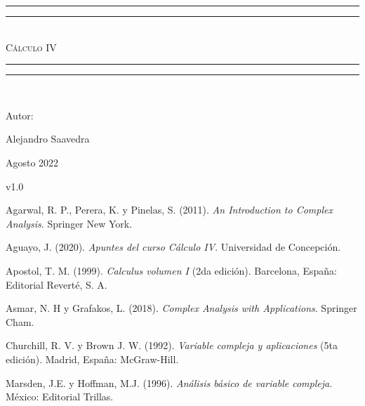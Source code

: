 \documentclass[letterpaper,12pt]{report}
\newlength{\drop}
\begin{document}
\begin{titlepage}
 \textheight
    \centering
    \vspace*{\baselineskip}
    \rule{\textwidth}{1.6pt}\vspace*{-\baselineskip}\vspace*{2pt}
    \rule{\textwidth}{0.4pt}\\[\baselineskip]
    {\scshape\Huge Cálculo IV} \\[0.2\baselineskip]
    \rule{\textwidth}{0.4pt}\vspace*{-\baselineskip}\vspace{3.2pt}
    \rule{\textwidth}{1.6pt}\\[\baselineskip]
    {\Large Autor: \par}
{\Large Alejandro Saavedra \par}
\vfill
{\large Agosto 2022 \par}
{\large v1.0 \par}
\end{titlepage}
\tableofcontents









\begin{thebibliography}{99}

 Agarwal, R. P., Perera, K. y Pinelas, S. (2011). \textit{An Introduction to Complex Analysis}. Springer New York. 

 Aguayo, J. (2020). \textit{Apuntes del curso Cálculo IV}. Universidad de Concepción.

 Apostol, T. M. (1999). \textit{Calculus volumen I} (2da edición). Barcelona, España: Editorial Reverté, S. A.

 Asmar, N. H y Grafakos, L. (2018). \textit{Complex Analysis with Applications}. Springer Cham. 

 Churchill, R. V. y Brown J. W. (1992). \textit{Variable compleja y aplicaciones} (5ta edición). Madrid, España: McGraw-Hill.

 Marsden, J.E. y Hoffman, M.J. (1996). \textit{Análisis básico de variable compleja}. México: Editorial Trillas. 

\end{thebibliography}
\end{document}
